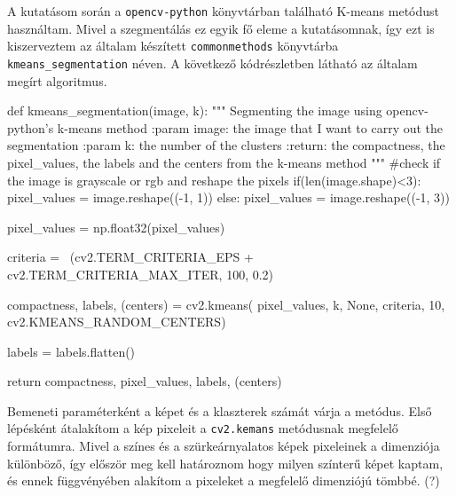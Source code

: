 A kutatásom során a \texttt{opencv-python} könyvtárban található K-means metódust használtam. Mivel a szegmentálás ez egyik fő eleme a kutatásomnak, így ezt is kiszerveztem az általam készített \texttt{commonmethods} könyvtárba \texttt{kmeans\_segmentation} néven. A következő kódrészletben látható az általam megírt algoritmus.
\begin{python}
def kmeans_segmentation(image, k):
    """
    Segmenting the image using opencv-python's k-means method
    :param image: the image that I want to carry out the segmentation
    :param k: the number of the clusters
    :return: the compactness, the pixel_values, the labels and the
        centers from the k-means method
    """
    #check if the image is grayscale or rgb and reshape the pixels
    if(len(image.shape)<3):
        pixel_values = image.reshape((-1, 1))
    else:
        pixel_values = image.reshape((-1, 3))

    pixel_values = np.float32(pixel_values)

    criteria = \
        (cv2.TERM_CRITERIA_EPS + cv2.TERM_CRITERIA_MAX_ITER, 100, 0.2)

    compactness, labels, (centers) = cv2.kmeans(
        pixel_values,
        k,
        None,
        criteria,
        10,
        cv2.KMEANS_RANDOM_CENTERS)

    labels = labels.flatten()

    return compactness, pixel_values, labels, (centers)
\end{python}

Bemeneti paraméterként a képet és a klaszterek számát várja a metódus. Első lépésként átalakítom a kép pixeleit a \texttt{cv2.kemans} metódusnak megfelelő formátumra. Mivel a színes és a szürkeárnyalatos képek pixeleinek a dimenziója különböző, így először meg kell határoznom hogy milyen színterű képet kaptam, és ennek függvényében alakítom a pixeleket a megfelelő dimenziójú tömbbé. (?)

